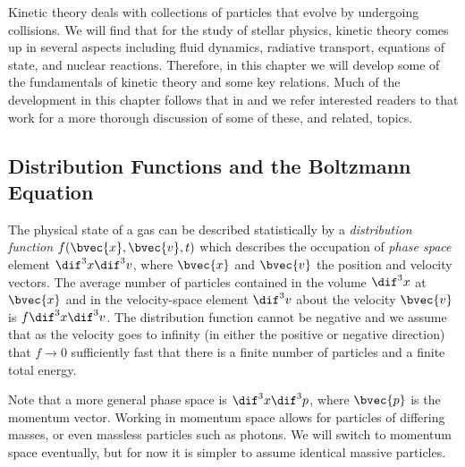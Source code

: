 
Kinetic theory deals with collections of particles that evolve by undergoing collisions.
We will find that for the study of stellar physics, kinetic theory comes up in several aspects including fluid dynamics, radiative transport, equations of state, and nuclear reactions.
Therefore, in this chapter we will develop some of the fundamentals of kinetic theory and some key relations.
Much of the development in this chapter follows that in \citet{mihalas:1984} and we refer interested readers to that work for a more thorough discussion of some of these, and related, topics.

\subsection{Distribution Functions and the Boltzmann Equation}
The physical state of a gas can be described statistically by a {\it distribution function} $f(\bvec{x},\bvec{v},t)$ which describes the occupation of {\it phase space} element $\dif^3 x \dif^3 v$, where $\bvec{x}$ and $\bvec{v}$ the position and velocity vectors. 
The average number of particles contained in the volume $\dif^3 x$ at $\bvec{x}$ and in the velocity-space element $\dif^3 v$ about the velocity $\bvec{v}$ is $f\dif^3 x \dif^3 v$.
The distribution function cannot be negative and we assume that as the velocity goes to infinity (in either the positive or negative direction) that $f\rightarrow0$ sufficiently fast that there is a finite number of particles and a finite total energy.

Note that a more general phase space is $\dif^3 x \dif^3 p$, where $\bvec{p}$ is the momentum vector.
Working in momentum space allows for particles of differing masses, or even massless particles such as photons.
We will switch to momentum space eventually, but for now it is simpler to assume identical massive particles.

